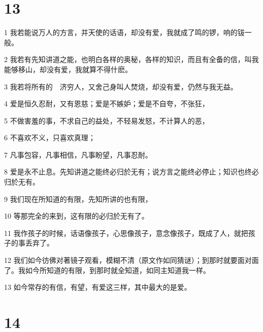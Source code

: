 \chapter{13}

\par 1 我若能说万人的方言，并天使的话语，却没有爱，我就成了鸣的锣，响的钹一般。
\par 2 我若有先知讲道之能，也明白各样的奥秘，各样的知识，而且有全备的信，叫我能够移山，却没有爱，我就算不得什麽。
\par 3 我若将所有的　济穷人，又舍己身叫人焚烧，却没有爱，仍然与我无益。
\par 4 爱是恒久忍耐，又有恩慈；爱是不嫉妒；爱是不自夸，不张狂，
\par 5 不做害羞的事，不求自己的益处，不轻易发怒，不计算人的恶，
\par 6 不喜欢不义，只喜欢真理；
\par 7 凡事包容，凡事相信，凡事盼望，凡事忍耐。
\par 8 爱是永不止息。先知讲道之能终必归於无有；说方言之能终必停止；知识也终必归於无有。
\par 9 我们现在所知道的有限，先知所讲的也有限，
\par 10 等那完全的来到，这有限的必归於无有了。
\par 11 我作孩子的时候，话语像孩子，心思像孩子，意念像孩子，既成了人，就把孩子的事丢弃了。
\par 12 我们如今彷佛对著镜子观看，模糊不清（原文作如同猜谜）；到那时就要面对面了。我如今所知道的有限，到那时就全知道，如同主知道我一样。
\par 13 如今常存的有信，有望，有爱这三样，其中最大的是爱。

\chapter{14}

